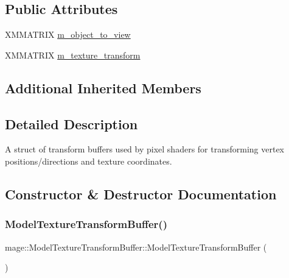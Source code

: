 \subsection*{Public Attributes}
\begin{DoxyCompactItemize}
\item 
X\+M\+M\+A\+T\+R\+IX \hyperlink{structmage_1_1_model_texture_transform_buffer_adb5e9e5b5d8c48267f0947c1ebc67b27}{m\+\_\+object\+\_\+to\+\_\+view}
\item 
X\+M\+M\+A\+T\+R\+IX \hyperlink{structmage_1_1_model_texture_transform_buffer_aec121458581c6508c8caaab65b073b73}{m\+\_\+texture\+\_\+transform}
\end{DoxyCompactItemize}
\subsection*{Additional Inherited Members}


\subsection{Detailed Description}
A struct of transform buffers used by pixel shaders for transforming vertex positions/directions and texture coordinates. 

\subsection{Constructor \& Destructor Documentation}
\hypertarget{structmage_1_1_model_texture_transform_buffer_a500d8232f1350b0beccc2181951309d6}{}\label{structmage_1_1_model_texture_transform_buffer_a500d8232f1350b0beccc2181951309d6} 
\subsubsection{\texorpdfstring{Model\+Texture\+Transform\+Buffer()}{ModelTextureTransformBuffer()}\hspace{0.1cm}{\footnotesize\ttfamily [1/3]}}
{\footnotesize\ttfamily mage\+::\+Model\+Texture\+Transform\+Buffer\+::\+Model\+Texture\+Transform\+Buffer (\begin{DoxyParamCaption}{ }\end{DoxyParamCaption})}

